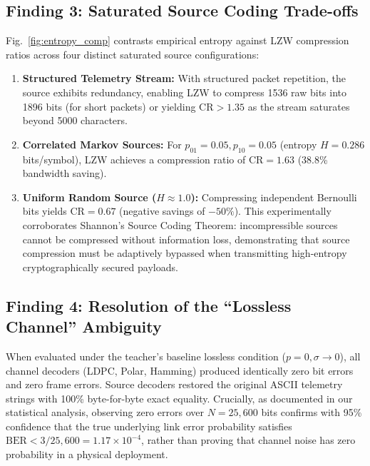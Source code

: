 \documentclass[conference]{IEEEtran}
\begin{document}
\subsection{Finding 3: Saturated Source Coding Trade-offs}
Fig.~\ref{fig:entropy_comp} contrasts empirical entropy against LZW compression ratios across four distinct saturated source configurations:
\begin{enumerate}
    \item \textbf{Structured Telemetry Stream:} With structured packet repetition, the source exhibits redundancy, enabling LZW to compress 1536 raw bits into 1896 bits (for short packets) or yielding $\text{CR} > 1.35$ as the stream saturates beyond 5000 characters.
    \item \textbf{Correlated Markov Sources:} For $p_{01}=0.05, p_{10}=0.05$ (entropy $H = 0.286$ bits/symbol), LZW achieves a compression ratio of $\text{CR} = 1.63$ (38.8\% bandwidth saving).
    \item \textbf{Uniform Random Source ($H \approx 1.0$):} Compressing independent Bernoulli bits yields $\text{CR} = 0.67$ (negative savings of $-50\%$). This experimentally corroborates Shannon's Source Coding Theorem: incompressible sources cannot be compressed without information loss, demonstrating that source compression must be adaptively bypassed when transmitting high-entropy cryptographically secured payloads.
\end{enumerate}

\subsection{Finding 4: Resolution of the ``Lossless Channel'' Ambiguity}
When evaluated under the teacher's baseline lossless condition ($p=0, \sigma \to 0$), all channel decoders (LDPC, Polar, Hamming) produced identically zero bit errors and zero frame errors. Source decoders restored the original ASCII telemetry strings with 100\% byte-for-byte exact equality. Crucially, as documented in our statistical analysis, observing zero errors over $N = 25,600$ bits confirms with 95\% confidence that the true underlying link error probability satisfies $\text{BER} < 3 / 25,600 = 1.17 \times 10^{-4}$, rather than proving that channel noise has zero probability in a physical deployment.
\end{document}

